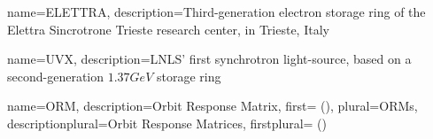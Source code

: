 
{
  name={ELETTRA},
  description={Third-generation electron storage ring of the Elettra Sincrotrone Trieste research center, in Trieste, Italy}
}



{
  name={UVX},
  description={LNLS' first synchrotron light-source, based on a second-generation $1.37\unit{G eV}$ storage ring}
}

{
  name={ORM},
  description={Orbit Response Matrix},
  first={ ()},
  plural={ORMs},
  descriptionplural={Orbit Response Matrices},
  firstplural={ ()}
}






